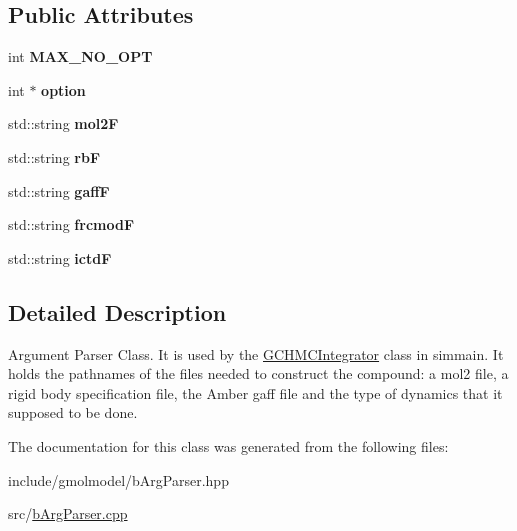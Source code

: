 \subsection*{Public Attributes}
\begin{DoxyCompactItemize}
\item 
int {\bfseries M\+A\+X\+\_\+\+N\+O\+\_\+\+O\+PT}\hypertarget{classbArgParser_a7cca8cd7c79c5e6d5a61bddec8ca6158}{}\label{classbArgParser_a7cca8cd7c79c5e6d5a61bddec8ca6158}

\item 
int $\ast$ {\bfseries option}\hypertarget{classbArgParser_a299ef19294e93f7f592916778b3d995f}{}\label{classbArgParser_a299ef19294e93f7f592916778b3d995f}

\item 
std\+::string {\bfseries mol2F}\hypertarget{classbArgParser_aebb226c57803a0345a10e38c2d477f2a}{}\label{classbArgParser_aebb226c57803a0345a10e38c2d477f2a}

\item 
std\+::string {\bfseries rbF}\hypertarget{classbArgParser_a9cf67edfd6b697ac460150bc1ccc88ac}{}\label{classbArgParser_a9cf67edfd6b697ac460150bc1ccc88ac}

\item 
std\+::string {\bfseries gaffF}\hypertarget{classbArgParser_a981bb3ee56f64fcedb2deee33d8dacbc}{}\label{classbArgParser_a981bb3ee56f64fcedb2deee33d8dacbc}

\item 
std\+::string {\bfseries frcmodF}\hypertarget{classbArgParser_a83d6b64d3e3e39796b2cdee9a41e8391}{}\label{classbArgParser_a83d6b64d3e3e39796b2cdee9a41e8391}

\item 
std\+::string {\bfseries ictdF}\hypertarget{classbArgParser_aa09c7af4426691f7c0bfaac27fd1ba80}{}\label{classbArgParser_aa09c7af4426691f7c0bfaac27fd1ba80}

\end{DoxyCompactItemize}


\subsection{Detailed Description}
Argument Parser Class. It is used by the \hyperlink{classGCHMCIntegrator}{G\+C\+H\+M\+C\+Integrator} class in simmain. It holds the pathnames of the files needed to construct the compound\+: a mol2 file, a rigid body specification file, the Amber gaff file and the type of dynamics that it supposed to be done. 

The documentation for this class was generated from the following files\+:\begin{DoxyCompactItemize}
\item 
include/gmolmodel/b\+Arg\+Parser.\+hpp\item 
src/\hyperlink{bArgParser_8cpp}{b\+Arg\+Parser.\+cpp}\end{DoxyCompactItemize}
